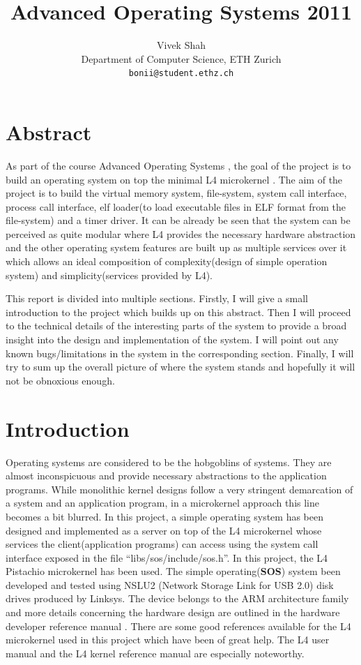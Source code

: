 \documentclass[a4paper, 11pt]{article}
\title{Advanced Operating Systems 2011}
\author{Vivek Shah \\Department of Computer Science, ETH Zurich \\
\texttt{bonii@student.ethz.ch}}
\begin{document}
    
\maketitle
\newpage
\tableofcontents
\newpage

\section{Abstract}
As part of the course Advanced Operating Systems \cite{os-project},
the goal of the project is to build an operating system on top the
minimal L4 microkernel \cite{l4}. The aim of the project is to build
the virtual memory system, file-system, system call interface, process
call interface, elf loader(to load executable files in ELF \cite{elf}
format from
the file-system) and a timer driver. It can be already be seen that the
system can be perceived as quite modular where L4 provides the
necessary hardware abstraction and the other operating system features
are built up as multiple services over it which allows an ideal
composition of complexity(design of simple operation system) and
simplicity(services provided by L4). 

This report is divided into multiple sections. Firstly, I will give a
small introduction to the project which builds up on this
abstract. Then I will proceed to the technical details of the
interesting parts of the system to provide a broad insight into the
design and implementation of the system. I will point out any known
bugs/limitations in the system in the corresponding section. Finally,
I will try to sum up the overall picture of where the system stands
and hopefully it will not be obnoxious enough. 

\newpage
\section{Introduction}
Operating systems are considered to be the hobgoblins of systems. They
are almost inconspicuous and provide necessary abstractions to the application
programs. While monolithic kernel designs follow a very stringent
demarcation of a system and an application program, in a microkernel
approach this line becomes a bit blurred. In this project, a simple
operating system has been designed and implemented as a server on top
of the L4 microkernel whose services the client(application programs)
can access using the system call interface exposed in the file
``libs/sos/include/sos.h''.  In this project, the L4 Pistachio microkernel
\cite{l4-pistachio} has been used. The simple operating({\bf SOS}) system been
developed and tested using NSLU2 (Network Storage Link for USB 2.0)
disk drives \cite{slug} produced by Linksys. The device belongs to the
ARM architecture family \cite{arm-manual} and more details concerning
the hardware design are outlined in the hardware developer reference manual 
\cite{slug-manual}. There are some good references available for the
L4 microkernel used in this project which have been of great help. The L4
user manual \cite{l4-usermanual} and the L4 kernel reference manual
\cite{l4-manual} are especially noteworthy.
\end{document}
